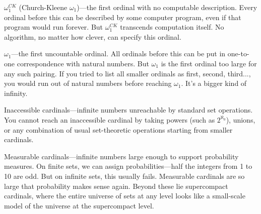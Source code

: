 $\omega_1^{CK}$ (Church-Kleene $\omega_1$)—the first ordinal with no computable description. Every ordinal before this can be described by some computer program, even if that program would run forever. But $\omega_1^{CK}$ transcends computation itself. No algorithm, no matter how clever, can specify this ordinal. 

$\omega_1$—the first uncountable ordinal. All ordinals before this can be put in one-to-one correspondence with natural numbers. But $\omega_1$ is the first ordinal too large for any such pairing. If you tried to list all smaller ordinals as first, second, third..., you would run out of natural numbers before reaching $\omega_1$. It's a bigger kind of infinity.

Inaccessible cardinals—infinite numbers unreachable by standard set operations. You cannot reach an inaccessible cardinal by taking powers (such as $2^{\aleph_0}$), unions, or any combination of usual set-theoretic operations starting from smaller cardinals.

Measurable cardinals—infinite numbers large enough to support probability measures. On finite sets, we can assign probabilities—half the integers from 1 to 10 are odd. But on infinite sets, this usually fails. Measurable cardinals are so large that probability makes sense again. Beyond these lie supercompact cardinals, where the entire universe of sets at any level looks like a small-scale model of the universe at the supercompact level.
